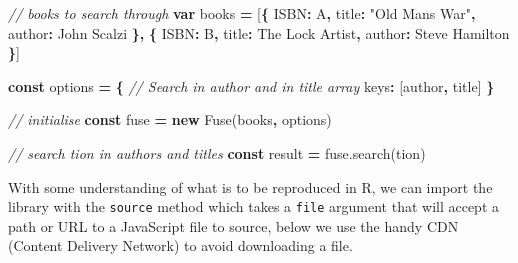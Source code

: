 \documentclass[
]{krantz}
\makeatletter
\newenvironment{Shaded}{\begin{snugshade}}{\end{snugshade}}
\newcommand{\AttributeTok}[1]{\textcolor[rgb]{0.61,0.61,0.61}{#1}}
\newcommand{\CommentTok}[1]{\textcolor[rgb]{0.37,0.37,0.37}{\textit{#1}}}
\newcommand{\DataTypeTok}[1]{\textcolor[rgb]{0.27,0.27,0.27}{#1}}
\newcommand{\KeywordTok}[1]{\textcolor[rgb]{0.27,0.27,0.27}{\textbf{#1}}}
\newcommand{\NormalTok}[1]{#1}
\newcommand{\OperatorTok}[1]{\textcolor[rgb]{0.43,0.43,0.43}{\textbf{#1}}}
\newcommand{\StringTok}[1]{\textcolor[rgb]{0.5,0.5,0.5}{#1}}
\newcommand{\VariableTok}[1]{\textcolor[rgb]{0,0,0}{#1}}
\newenvironment{kframe}{%
\medskip{}
\setlength{\fboxsep}{.8em}
 \def\at@end@of@kframe{}%
 \ifinner\ifhmode%
  \def\at@end@of@kframe{\end{minipage}}%
  \begin{minipage}{\columnwidth}%
 \fi\fi%
 \def\FrameCommand##1{\hskip\@totalleftmargin \hskip-\fboxsep
 \colorbox{shadecolor}{##1}\hskip-\fboxsep
     \hskip-\linewidth \hskip-\@totalleftmargin \hskip\columnwidth}%
 \MakeFramed {\advance\hsize-\width
   \@totalleftmargin\z@ \linewidth\hsize
   \@setminipage}}%
 {\par\unskip\endMakeFramed%
 \at@end@of@kframe}
\renewenvironment{Shaded}{\begin{kframe}}{\end{kframe}}
\makeatother
\begin{document}
\begin{Shaded}
\begin{Highlighting}[]
\CommentTok{// books to search through}
\KeywordTok{var}\NormalTok{ books }\OperatorTok{=}\NormalTok{ [}\OperatorTok{\{}
  \StringTok{\textquotesingle{}ISBN\textquotesingle{}}\OperatorTok{:} \StringTok{\textquotesingle{}A\textquotesingle{}}\OperatorTok{,}
  \StringTok{\textquotesingle{}title\textquotesingle{}}\OperatorTok{:} \StringTok{"Old Man\textquotesingle{}s War"}\OperatorTok{,}
  \StringTok{\textquotesingle{}author\textquotesingle{}}\OperatorTok{:} \StringTok{\textquotesingle{}John Scalzi\textquotesingle{}}
\OperatorTok{\},} \OperatorTok{\{}
  \StringTok{\textquotesingle{}ISBN\textquotesingle{}}\OperatorTok{:} \StringTok{\textquotesingle{}B\textquotesingle{}}\OperatorTok{,}
  \StringTok{\textquotesingle{}title\textquotesingle{}}\OperatorTok{:} \StringTok{\textquotesingle{}The Lock Artist\textquotesingle{}}\OperatorTok{,}
  \StringTok{\textquotesingle{}author\textquotesingle{}}\OperatorTok{:} \StringTok{\textquotesingle{}Steve Hamilton\textquotesingle{}}
\OperatorTok{\}}\NormalTok{]}

\KeywordTok{const}\NormalTok{ options }\OperatorTok{=} \OperatorTok{\{}
  \CommentTok{// Search in \textasciigrave{}author\textasciigrave{} and in \textasciigrave{}title\textasciigrave{} array}
  \DataTypeTok{keys}\OperatorTok{:}\NormalTok{ [}\StringTok{\textquotesingle{}author\textquotesingle{}}\OperatorTok{,} \StringTok{\textquotesingle{}title\textquotesingle{}}\NormalTok{]}
\OperatorTok{\}}

\CommentTok{// initialise}
\KeywordTok{const}\NormalTok{ fuse }\OperatorTok{=} \KeywordTok{new} \AttributeTok{Fuse}\NormalTok{(books}\OperatorTok{,}\NormalTok{ options)}

\CommentTok{// search \textquotesingle{}tion\textquotesingle{} in authors and titles}
\KeywordTok{const}\NormalTok{ result }\OperatorTok{=} \VariableTok{fuse}\NormalTok{.}\AttributeTok{search}\NormalTok{(}\StringTok{\textquotesingle{}tion\textquotesingle{}}\NormalTok{)}
\end{Highlighting}
\end{Shaded}

With some understanding of what is to be reproduced in R, we can import the library with the \texttt{source} method which takes a \texttt{file} argument that will accept a path or URL to a JavaScript file to source, below we use the handy CDN (Content Delivery Network) to avoid downloading a file.

\begin{Shaded}
\end{Shaded}
\end{document}
